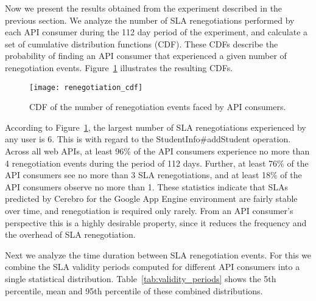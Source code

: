 Now we present the results obtained from the experiment described in the previous section. We 
analyze the number of SLA renegotiations performed by each API consumer during the 112 day
period of the experiment, and calculate a set of cumulative distribution functions (CDF). These
CDFs describe the probability of finding an API consumer that experienced a given number of
renegotiation events. Figure~\ref{fig:renegotiation_cdf} illustrates the resulting CDFs.

\begin{figure}
\centering
\texttt{[image: renegotiation\_cdf]}
\caption{CDF of the number of renegotiation events faced by API consumers.}
\label{fig:renegotiation_cdf}
\vspace{-0.2in}
\end{figure}

According to Figure~\ref{fig:renegotiation_cdf}, the largest number of SLA renegotiations experienced by 
any user is 6. This is
with regard to the StudentInfo\#addStudent operation. Across all web APIs, at least 96\% of the API
consumers experience no more than 4 renegotiation events during the period of 112 days. Further,
at least 76\% of the API consumers see no more than 3 SLA renegotiations, and at least 18\% of
the API consumers observe no more than 1. These statistics
indicate that SLAs predicted by Cerebro for the Google App Engine environment are fairly
stable over time, and renegotiation is required only rarely. From an API consumer's perspective
this is a highly desirable property, since it reduces the frequency and the overhead of SLA renegotiation.

Next we analyze the time duration between SLA renegotiation events. For this we combine the SLA validity
periods computed for different API consumers into a single statistical distribution. 
Table~\ref{tab:validity_periods} shows the 5th percentile, mean and 95th percentile of these combined distributions. 


